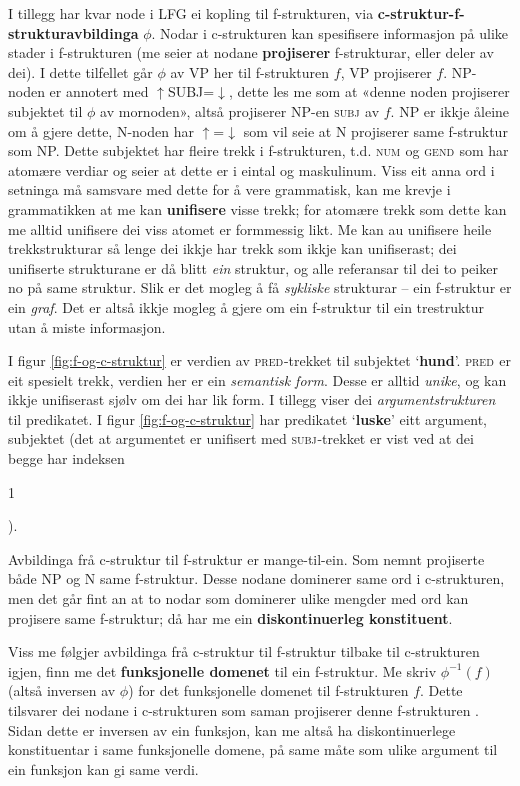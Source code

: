 \documentclass[11pt,a4paper,oneside,draft]{book}
\makeatletter
\newcommand{\ind}[1]{{\avmoptions{}\begin{avm}\@{#1}\end{avm}}}
\newcommand{\F}[2]{\textsc{#1}\ensuremath{_{#2}}}
\newcommand{\SUBJ}{\F{subj}{}}
\newcommand{\GEND}{\F{gend}{}}
\newcommand{\NUM}{\F{num}{}}
\newcommand{\PRED}{\F{pred}{}}
\newcommand{\ua}{\ensuremath{\uparrow}}
\newcommand{\da}{\ensuremath{\downarrow}}
\newcommand{\p}[1]{`\textbf{#1}'}
\makeatother
\begin{document}
 I tillegg har kvar node i LFG ei kopling til f-strukturen, via
 \textbf{c-struktur-f-strukturavbildinga} $\phi{}$. Nodar i c-strukturen kan
 spesifisere informasjon på ulike stader i f-strukturen (me seier at
 nodane \textbf{projiserer} f-strukturar, eller deler av dei).  I dette
 tilfellet går $\phi$ av VP her til f-strukturen $f$, VP projiserer
 $f$. NP-noden er annotert med \ua{}SUBJ=\da{}, dette les me som at
 «denne noden projiserer subjektet til $\phi$ av mornoden», altså
 projiserer NP-en \SUBJ{} av $f$. NP er ikkje åleine om å gjere dette,
 N-noden har \ua{}=\da{} som vil seie at N projiserer same f-struktur
 som NP. Dette subjektet har fleire trekk i f-strukturen, t.d. \NUM{}
 og \GEND{} som har atomære verdiar og seier at dette er i eintal og
 maskulinum. Viss eit anna ord i setninga må samsvare med dette for å
 vere grammatisk, kan me krevje i grammatikken at me kan \textbf{unifisere}
 visse trekk; for atomære trekk som dette kan me alltid unifisere dei
 viss atomet er formmessig likt. Me kan au unifisere heile
 trekkstrukturar så lenge dei ikkje har trekk som ikkje kan
 unifiserast; dei unifiserte strukturane er då blitt \emph{ein} struktur,
 og alle referansar til dei to peiker no på same struktur. Slik er det
 mogleg å få \emph{sykliske} strukturar -- ein f-struktur er ein
 \emph{graf}. Det er altså ikkje mogleg å gjere om ein f-struktur til ein
 trestruktur utan å miste informasjon.

 I figur \ref{fig:f-og-c-struktur} er verdien av \PRED{}-trekket til
 subjektet \p{hund}. \PRED{} er eit spesielt trekk, verdien her er ein
 \emph{semantisk form}. Desse er alltid \emph{unike}, og kan ikkje unifiserast
 sjølv om dei har lik form. I tillegg viser dei \emph{argumentstrukturen}
 til predikatet. I figur \ref{fig:f-og-c-struktur} har predikatet
 \p{luske} eitt argument, subjektet (det at argumentet er unifisert
 med \SUBJ{}-trekket er vist ved at dei begge har indeksen \ind{1}).

 Avbildinga frå c-struktur til f-struktur er mange-til-ein. Som nemnt
 projiserte både NP og N same f-struktur. Desse nodane dominerer same
 ord i c-strukturen, men det går fint an at to nodar som dominerer
 ulike mengder med ord kan projisere same f-struktur; då har me ein
 \textbf{diskontinuerleg konstituent}.

 Viss me følgjer avbildinga frå c-struktur til f-struktur tilbake til
 c-strukturen igjen, finn me det \textbf{funksjonelle domenet} til ein
 f-struktur. Me skriv $\phi^{-1}(f)$ (altså inversen av $\phi$) for
 det funksjonelle domenet til f-strukturen $f$. Dette tilsvarer dei
 nodane i c-strukturen som saman projiserer denne f-strukturen
 \citep[s.~126]{bresnan2001lfs}. Sidan dette er inversen av ein
 funksjon, kan me altså ha diskontinuerlege konstituentar i same
 funksjonelle domene, på same måte som ulike argument til ein funksjon
 kan gi same verdi.
\end{document}

